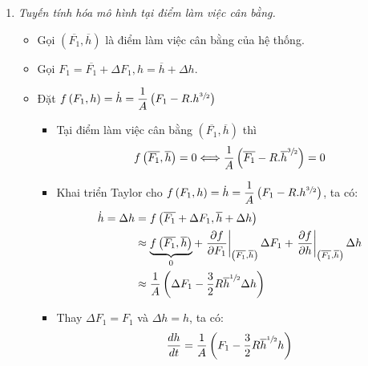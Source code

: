 \documentclass[12pt,a4paper]{article}
\begin{document}
\begin{enumerate}[\it a.]
            \item \textit{Tuyến tính hóa mô hình tại điểm làm việc cân bằng.}
                \begin{itemize}
                    \item Gọi $\left({ \overline{F_1}, \overline{h} }\right)$ là điểm làm việc cân bằng của hệ thống.

                    \item Gọi $F_1 = \overline{F_1} + \Delta F_1, h = \overline{h} + \Delta h$.

                    \item Đặt $f\left({F_1, h}\right) = \dot{h} = \dfrac{1}{A} \left({F_1 - R.h^{\sfrac{3}{2}} }\right)$
                        \begin{itemize}
                            \item Tại điểm làm việc cân bằng $\left({ \overline{F_1}, \overline{h} }\right)$ thì
                                \begin{align}
                                    f\left({ \overline{F_1}, \overline{h} }\right) = 0 \Longleftrightarrow \dfrac{1}{A} \left({ \overline{F_1} - R.\overline{h}^{\sfrac{3}{2}} }\right) = 0
                                \end{align}

                            \item Khai triển Taylor cho $f\left({F_1, h}\right) = \dot{h} = \dfrac{1}{A} \left({F_1 - R.h^{\sfrac{3}{2}} }\right)$, ta có:
                                \begin{align}
                                    \dot{h} = \Delta h & = f\left({\overline{F_1} + \Delta F_1, \overline{h} + \Delta h }\right) \\
                                    & \approx \underbrace{f\left({ \overline{F_1}, \overline{h} }\right)}_{0} + \left.\dfrac{\partial f}{\partial F_1}\right|_{ \left({ \overline{F_1}, \overline{h} }\right)} \Delta F_1 + \left.\dfrac{\partial f}{\partial h}\right|_{ \left({ \overline{F_1}, \overline{h} }\right)} \Delta h\\
                                    & \approx \dfrac{1}{A} \left({ \Delta F_1 - \dfrac{3}{2} R \overline{h} ^{\sfrac{1}{2}}  \Delta h}\right)\\
                                \end{align}

                            \item Thay $\Delta F_1 = F_1$ và $\Delta h = h$, ta có:
                                \begin{align}
                                    \dfrac{d h}{dt} = \dfrac{1}{A} \left({ F_1 - \dfrac{3}{2} R \overline{h} ^{\sfrac{1}{2}}  h}\right)
                                \end{align}
                        \end{itemize}


\end{itemize}
\end{enumerate}
\end{document}
